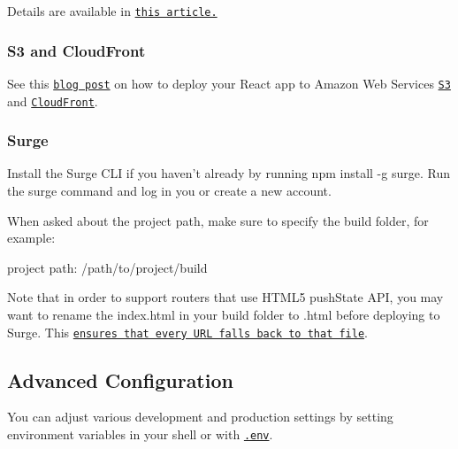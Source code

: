 Details are available in \href{https://zeit.co/blog/unlimited-static}{\tt this article.}

\subsubsection*{S3 and Cloud\+Front}

See this \href{https://medium.com/@omgwtfmarc/deploying-create-react-app-to-s3-or-cloudfront-48dae4ce0af}{\tt blog post} on how to deploy your React app to Amazon Web Services \href{https://aws.amazon.com/s3}{\tt S3} and \href{https://aws.amazon.com/cloudfront/}{\tt Cloud\+Front}.

\subsubsection*{Surge}

Install the Surge C\+LI if you haven’t already by running {\ttfamily npm install -\/g surge}. Run the {\ttfamily surge} command and log in you or create a new account.

When asked about the project path, make sure to specify the {\ttfamily build} folder, for example\+:


\begin{DoxyCode}
project path: /path/to/project/build
\end{DoxyCode}


Note that in order to support routers that use H\+T\+M\+L5 {\ttfamily push\+State} A\+PI, you may want to rename the {\ttfamily index.\+html} in your build folder to {.\+html} before deploying to Surge. This \href{https://surge.sh/help/adding-a-200-page-for-client-side-routing}{\tt ensures that every U\+RL falls back to that file}.

\subsection*{Advanced Configuration}

You can adjust various development and production settings by setting environment variables in your shell or with \href{#adding-development-environment-variables-in-env}{\tt .env}.

